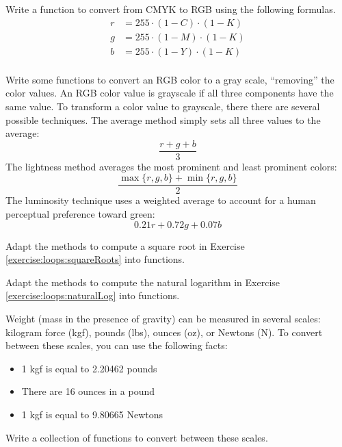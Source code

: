 \begin{exer}
\label{exercise:functions:cmykToRGB}
Write a function to convert from CMYK to RGB using the following formulas.
\begin{align*}
r & = 255 \cdot (1 - C) \cdot (1-K) \\
g & = 255 \cdot (1 - M) \cdot (1-K) \\
b & = 255 \cdot (1 - Y) \cdot (1-K) \\
\end{align*}
\end{exer}

\begin{exer}
Write some functions to convert an RGB color to a gray scale, ``removing'' the color 
values.  An RGB color value is grayscale if all three components have the same 
value.  To transform a color value to grayscale, there there are several possible 
techniques.  The average method simply sets all three values to the average:
  $$\frac{r + g + b}{3}$$
The lightness method averages the most prominent and least prominent colors:
  $$\frac{\max\{r, g, b\} + \min\{r, g, b\}}{2}$$
The luminosity technique uses a weighted average to account for a human perceptual
preference toward green:
  $$0.21 r + 0.72 g + 0.07 b$$
\end{exer}

\begin{exer}
\label{exercise:functions:squareRoots}
Adapt the methods to compute a square root in Exercise 
\ref{exercise:loops:squareRoots} into functions.
\end{exer}

\begin{exer}
\label{exercise:functions:naturalLog}
Adapt the methods to compute the natural logarithm in Exercise 
\ref{exercise:loops:naturalLog} into functions.
\end{exer}

\begin{exer}
\label{exercise:functions:weight}
Weight (mass in the presence of gravity) can be measured in 
several scales: kilogram force (kgf), pounds (lbs), ounces (oz), or 
Newtons (N).  To convert between these scales, you can use the following facts:

\begin{itemize}
  \item 1 kgf is equal to 2.20462 pounds
  \item There are 16 ounces in a pound
  \item 1 kgf is equal to 9.80665 Newtons
\end{itemize}

Write a collection of functions to convert between these scales.
\end{exer}

